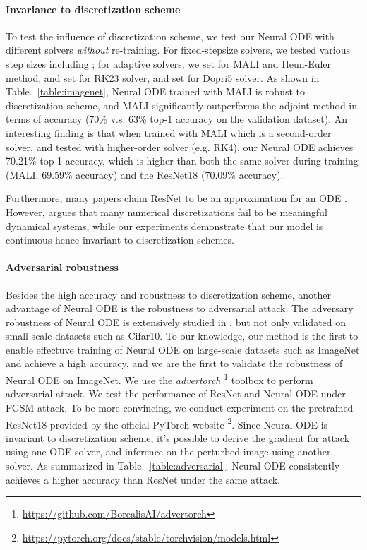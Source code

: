 \documentclass{article} \usepackage{iclr2021_conference,times}
\begin{document}
\paragraph{Invariance to discretization scheme}
To test the influence of discretization scheme, we test our Neural ODE with different solvers \textit{without} re-training. For fixed-stepsize solvers, we tested various step sizes including ; for adaptive solvers, we set  for MALI and Heun-Euler method, and set  for RK23 solver, and set  for Dopri5 solver. As shown in Table.~\ref{table:imagenet}, Neural ODE trained with MALI is robust to discretization scheme, and MALI significantly outperforms the adjoint method in terms of accuracy (70\% v.s. 63\% top-1 accuracy on the validation dataset). An interesting finding is that when trained with MALI which is a second-order solver, and tested with higher-order solver (e.g. RK4), our Neural ODE achieves 70.21\% top-1 accuracy, which is higher than both the same solver during training (MALI, 69.59\% accuracy) and the ResNet18 (70.09\% accuracy).

Furthermore, many papers claim ResNet to be an approximation for an ODE \citep{lu2018beyond}. However, \citet{queiruga2020continuous} argues that many numerical discretizations fail to be meaningful dynamical systems, while our experiments demonstrate that our model is continuous hence invariant to discretization schemes. 

\paragraph{Adversarial robustness}
Besides the high accuracy and robustness to discretization scheme, another advantage of Neural ODE is the robustness to adversarial attack. The adversary robustness of Neural ODE is extensively studied in \citep{hanshu2019robustness}, but not only validated on small-scale datasets such as Cifar10. To our knowledge, our method is the first to enable effectuve training of Neural ODE on large-scale datasets such as ImageNet and achieve a high accuracy, and we are the first to validate the robustness of Neural ODE on ImageNet. We use the \textit{advertorch} \footnote{\url{https://github.com/BorealisAI/advertorch}} toolbox to perform adversarial attack. We test the performance of ResNet and Neural ODE under FGSM attack. To be more convincing, we conduct experiment on the pretrained ResNet18 provided by the official PyTorch website \footnote{\url{https://pytorch.org/docs/stable/torchvision/models.html}}. Since Neural ODE is invariant to discretization scheme, it's possible to derive the gradient for attack using one ODE solver, and inference on the perturbed image using another solver. As summarized in Table.~\ref{table:adversarial}, Neural ODE consistently achieves a higher accuracy than ResNet under the same attack.
\end{document}
